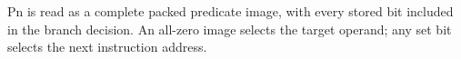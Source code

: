 Pn is read as a complete packed predicate image, with every stored bit included
in the branch decision.  An all-zero image selects the target operand; any set
bit selects the next instruction address.
